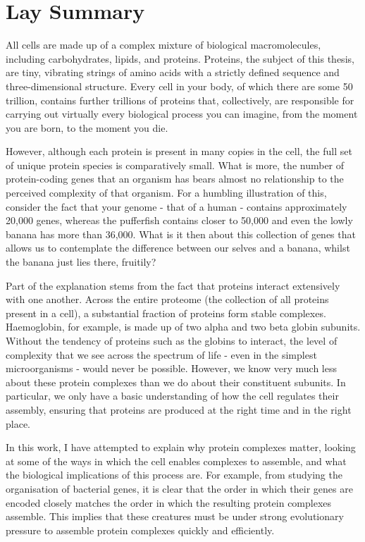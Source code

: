 \documentclass[a4paper,11pt,twoside,openright]{scrbook}
\begin{document}
\chapter*{Lay Summary}
All cells are made up of a complex mixture of biological macromolecules, including carbohydrates, lipids, and proteins. Proteins, the subject of this thesis, are tiny, vibrating strings of amino acids with a strictly defined sequence and three-dimensional structure. Every cell in your body, of which there are some 50 trillion, contains further trillions of proteins that, collectively, are responsible for carrying out virtually every biological process you can imagine, from the moment you are born, to the moment you die.

However, although each protein is present in many copies in the cell, the full set of unique protein species is comparatively small. What is more, the number of protein-coding genes that an organism has bears almost no relationship to the perceived complexity of that organism. For a humbling illustration of this, consider the fact that your genome - that of a human - contains approximately 20,000 genes, whereas the pufferfish contains closer to 50,000 and even the lowly banana has more than 36,000. What is it then about this collection of genes that allows us to contemplate the difference between our selves and a banana, whilst the banana just lies there, fruitily?

Part of the explanation stems from the fact that proteins interact extensively with one another. Across the entire proteome (the collection of all proteins present in a cell), a substantial fraction of proteins form stable complexes. Haemoglobin, for example, is made up of two alpha and two beta globin subunits. Without the tendency of proteins such as the globins to interact, the level of complexity that we see across the spectrum of life - even in the simplest microorganisms - would never be possible. However, we know very much less about these protein complexes than we do about their constituent subunits. In particular, we only have a basic understanding of how the cell regulates their assembly, ensuring that proteins are produced at the right time and in the right place.

In this work, I have attempted to explain why protein complexes matter, looking at some of the ways in which the cell enables complexes to assemble, and what the biological implications of this process are. For example, from studying the organisation of bacterial genes, it is clear that the order in which their genes are encoded closely matches the order in which the resulting protein complexes assemble. This implies that these creatures must be under strong evolutionary pressure to assemble protein complexes quickly and efficiently.
\end{document}
